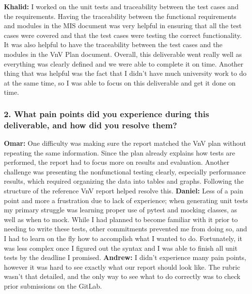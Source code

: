 \documentclass[12pt, titlepage]{article}
\begin{document}
\newline
\textbf{Khalid: } I worked on the unit tests and traceability between the test cases and the requirements. Having the traceability between the functional requirements and modules in the MIS document was very helpful in ensuring that all the test cases were covered and that the test cases were testing the correct functionality. It was also helpful to have the traceability between the test cases and the modules in the VnV Plan document. Overall, this deliverable went really well as everything was clearly defined and we were able to complete it on time. Another thing that was helpful was the fact that I didn't have much university work to do at the same time, so I was able to focus on this deliverable and get it done on time.

\subsubsection*{2. What pain points did you experience during this deliverable, and how
did you resolve them?}
\bigskip
\textbf{Omar: } One difficulty was making sure the report matched the VnV plan without repeating the same information. Since the plan already explains how tests are performed, the report had to focus more on results and evaluation. Another challenge was presenting the nonfunctional testing clearly, especially performance results, which required organizing the data into tables and graphs. Following the structure of the reference VnV report helped resolve this.
\newline
\newline
\textbf{Daniel: } Less of a pain point and more a frustration due to lack of experience; when generating unit tests my primary struggle was learning proper use of pytest and mocking classes, as well as when to mock. While I had planned to become familiar with it prior to needing to write these tests, other commitments prevented me from doing so, and I had to learn on the fly how to accomplish what I wanted to do. Fortunately, it was less complex once I figured out the syntax and I was able to finish all unit tests by the deadline I promised.
\newline
\newline
\textbf{Andrew: } I didn't experience many pain points, however it was hard to see exactly what our report should look like. The rubric wasn't that detailed, and the only way to see what to do correctly was to check prior submissions on the GitLab.
\newline
\end{document}
